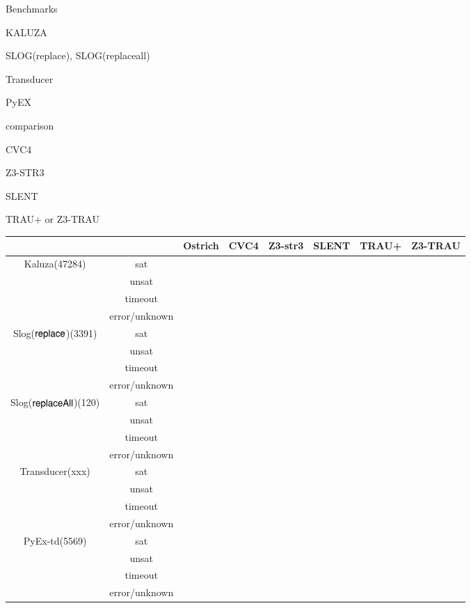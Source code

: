 
Benchmarks

KALUZA

SLOG(replace), SLOG(replaceall)

Transducer

PyEX \cite{ReynoldsWBBLT17}


comparison

CVC4

Z3-STR3

SLENT

TRAU+ or Z3-TRAU


\begin{table}[htbp]
\begin{center}
\begin{tabular}{|c|c|c|c|c|c|c|c|}
\hline
& & Ostrich & CVC4 & Z3-str3 & SLENT & TRAU+ & Z3-TRAU\\
\hline
\multirow{4}{*}{Kaluza(47284)} & sat &  &  &  &  & &\\
\cline{2-8}
 & unsat &  &  &  &  & &\\
\cline{2-8}
 & timeout &  &  &  &  & &\\
\cline{2-8}
 & error/unknown &  &  &  &  & &\\
\hline
\multirow{4}{*}{Slog($\mathsf{replace}$)(3391)} & sat &  &  &  &  & &\\
\cline{2-8}
 & unsat &  &  &  &  & &\\
\cline{2-8}
 & timeout &  &  &  &  & &\\
\cline{2-8}
 & error/unknown &  &  &  &  & &\\
\hline
\multirow{4}{*}{Slog($\mathsf{replaceAll}$)(120)} & sat &  &  &  &  & &\\
\cline{2-8}
 & unsat &  &  &  &  & &\\
\cline{2-8}
 & timeout &  &  &  &  & &\\
\cline{2-8}
 & error/unknown &  &  &  &  & &\\
\hline
\multirow{4}{*}{Transducer(xxx)} & sat &  &  &  &  & &\\
\cline{2-8}
 & unsat &  &  &  &  & &\\
\cline{2-8}
 & timeout &  &  &  &  & &\\
\cline{2-8}
 & error/unknown &  &  &  &  & &\\
\hline
\multirow{4}{*}{PyEx-td(5569)} & sat &  &  &  &  & &\\
\cline{2-8}
 & unsat &  &  &  &  & &\\
\cline{2-8}
 & timeout &  &  &  &  & &\\
\cline{2-8}
 & error/unknown &  &  &  &  & &\\

\end{tabular}
\end{center}
\end{table}
